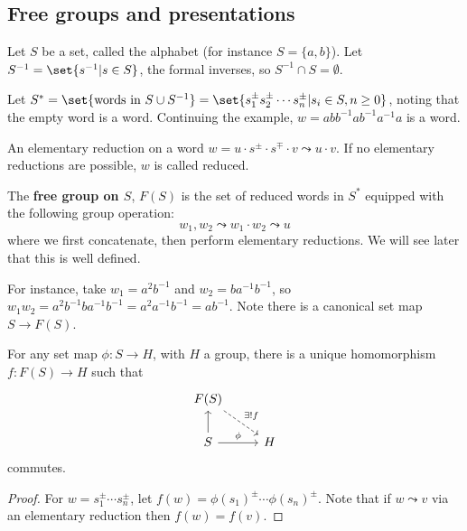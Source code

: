 \documentclass{article}
\numberwithin{nthm}{subsection}
\begin{document}
\subsection{Free groups and presentations}
Let $S$ be a set, called the alphabet (for instance $S = \{a, b\}$).
Let $S^{-1} = \set{s^{-1} | s \in S}$, the formal inverses, so $S^{-1} \cap S = \emptyset$.

Let $S^* = \set{\text{words in } S \cup S^{-1}} = \set{s_1^\pm s_2^\pm \dotsm s_n^\pm | s_i \in S, n \geq 0}$, noting that the empty word is a word.
Continuing the example, $w = a b b^{-1} a b^{-1} a^{-1} a$ is a word.

An elementary reduction on a word $w = u \cdot s^\pm \cdot s^\mp \cdot v \leadsto u \cdot v$.
If no elementary reductions are possible, $w$ is called reduced.

\begin{defi}
    The \textbf{free group on $S$}, $F(S)$ is the set of reduced words in $S^*$ equipped with the following group operation:
    \begin{equation*}
        w_1 , w_2 \leadsto w_1 \cdot w_2 \leadsto u
    \end{equation*}
    where we first concatenate, then perform elementary reductions.
    We will see later that this is well defined.
\end{defi}

For instance, take $w_1 = a^2 b^{-1}$ and $w_2 = b a^{-1} b^{-1}$, so $w_1 w_2 = a^2 b^{-1} b a^{-1} b^{-1} = a^2 a^{-1} b^{-1} = a b^{-1}$.
Note there is a canonical set map $S \to F(S)$.

\begin{lemma}
    For any set map $\phi:S \to H$, with $H$ a group, there is a unique homomorphism $f: F(S) \to H$ such that
    \begin{equation*}
        \begin{tikzcd}
            F(S) \arrow[rd, dashed, "\exists! f"] & \\
            S \arrow[u] \arrow[r, "\phi"] & H
        \end{tikzcd}
    \end{equation*}
    commutes.
\end{lemma}

\begin{proof}
    For $w = s_1^\pm \dotsm s_n^\pm$, let $f(w) = \phi(s_1)^\pm \dotsm \phi(s_n)^\pm$. Note that if $w \leadsto v$ via an elementary reduction then $f(w) = f(v)$.
\end{proof}
\end{document}
